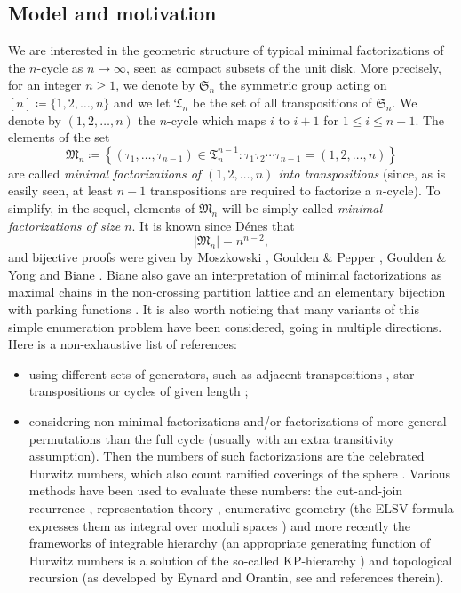 \documentclass[AHL,XML,longabstracts,Unicode]{cedram}
\begin{document}
\subsection{Model and motivation}
We are interested in the geometric structure of  typical minimal factorizations of the $n$-cycle as $n \rightarrow \infty$, seen as compact subsets of the unit disk. More precisely,  for an integer $n \geq 1$, we denote by $ \mathfrak{S}_{n}$  the symmetric group acting on $[n] \coloneqq \{1,2, \ldots,n\}$ and we let $ \mathfrak{T}_{n}$ be the set of all transpositions of $ \mathfrak{S}_{n}$. We denote by $(1,2, \ldots,n)$ the $n$-cycle which maps $i$ to $i+1$ for $1 \leq i \leq n-1$. The elements of the set
\[ \mathfrak{M}_{n} \coloneqq  \left\{ (\tau_{1}, \ldots, \tau_{n-1}) \in \mathfrak{T}_{n}^{n-1} : \tau_{1} \tau_{2} \cdots \tau_{n-1}= (1,2, \ldots,n)  \right\}\]
are called \emph{minimal factorizations of  $(1,2, \ldots,n)$ into transpositions} (since, as is easily seen, at least $n-1$ transpositions are required to factorize a $n$-cycle). To simplify, in the sequel, elements of $ \mathfrak{M}_{n}$ will be simply called \emph{minimal factorizations of size $n$}.  It is known since D\'enes \cite{Den59} that
\begin{equation}
\label{eq:cardFn}  |\mathfrak{M}_{n}|  =n^{n-2},
\end{equation}
and bijective proofs were given by Moszkowski \cite{Mos89},
Goulden \& Pepper \cite{GP93}, Goulden \& Yong \cite{GY02} and Biane \cite{Biane2004}.
Biane also gave an interpretation of minimal factorizations
as maximal chains in the non-crossing partition lattice \cite{Biane1997}
and an elementary bijection with parking functions \cite{Biane2002}.
It is also worth noticing that many variants of this simple enumeration problem
have been considered, going in multiple directions.
Here is a non-exhaustive list of references:
\begin{itemize}
  \item using different sets of generators, such as adjacent transpositions \cite{Sta84,EG87},
    star transpositions \cite{Pak1999,IrvingRattan2009,GouldenJackson2009,Fer12} or cycles of given length \cite{Biane2004};
  \item considering non-minimal factorizations and/or factorizations of more general
    permutations than the full cycle (usually with an extra transitivity assumption).
    Then the numbers of such factorizations are the celebrated Hurwitz numbers,
    which also
    count ramified coverings of the sphere \cite{Hur91}.
    Various methods have been used to evaluate these numbers:
    the cut-and-join recurrence \cite{GJ99A,GJ99B},
    representation theory \cite{Jac88,SSV97}, enumerative geometry
    (the ELSV formula expresses them as integral over moduli spaces \cite{ELSV})
    and more recently the frameworks of integrable hierarchy
    (an appropriate generating function of Hurwitz numbers
    is a solution of the so-called KP-hierarchy \cite{Oko00})
    and topological recursion (as developed by Eynard and Orantin, see \cite{ACEH16}
    and references therein).
\end{itemize}
\end{document}
